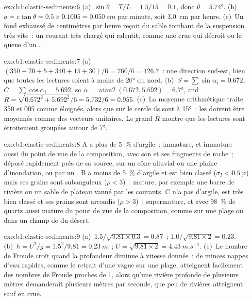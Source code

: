 \begin{solution}{exo:b1:clastic-sediments:6}
(a)~$\sin\theta = T/L = 1.5/15 = 0.1$, donc $\theta = \ang{5.74}$. (b)~$a =
c\tan\theta = 0.5 \times 0.1005 = \qty{0.050}{cm}$ par minute, soit
\qty{3.0}{cm} par heure. (c)~Un fond exhaussé de centimètres par heure reçoit du sable
tombant de la suspension très vite~: un courant très chargé qui ralentit,
comme une crue qui décroît ou la queue d'un .
\end{solution}

\begin{solution}{exo:b1:clastic-sediments:7}
(a)~$(350 + 20 + 5 + 340 + 15 + 30)/6 = 760/6 = 126.7$~: une direction
sud-est, bien que toutes les lectures soient à moins de \ang{20} du nord. (b)~$S =
\sum\sin\alpha_i = 0.672$, $C = \sum\cos\alpha_i = 5.692$, so $\bar\alpha =
\operatorname{atan2}(0.672, 5.692) = \ang{6.7}$, and $\bar R =
\sqrt{0.672^2 + 5.692^2}/6 = 5.732/6 = 0.955$. (c)~La moyenne arithmétique traite
350 et 005 comme éloignés, alors que sur le cercle ils sont à \ang{15}~: les 
doivent être moyennés comme des vecteurs unitaires. Le grand $\bar R$ montre que les lectures sont
étroitement groupées autour de \ang{7}.
\end{solution}

\begin{solution}{exo:b1:clastic-sediments:8}
A a plus de \qty{5}{\percent} d'argile~: immature, et immature aussi du point de vue de la composition,
avec son  et ses fragments de roche~; déposé rapidement près de sa
source, sur un cône alluvial ou une plaine d'inondation, ou par un . B a moins
de \qty{5}{\percent} d'argile et est bien classé ($\sigma_I < 0.5\,\varphi$) mais ses
grains sont subanguleux ($\rho < 3$)~: mature, par exemple une barre de rivière ou un sable
de plateau vanné par les courants. C n'a pas d'argile, est très bien classé et ses grains sont
arrondis ($\rho > 3$)~: supermature, et avec \qty{98}{\percent} de quartz aussi
mature du point de vue de la composition, comme sur une plage ou dans un champ de  du désert.
\end{solution}

\begin{solution}{exo:b1:clastic-sediments:9}
(a)~$1.5/\sqrt{9.81 \times 0.3} = 0.87$~; $1.0/\sqrt{9.81 \times 2} = 0.23$.
(b)~$h = U^2/g = 1.5^2/9.81 = \qty{0.23}{m}$~; $U = \sqrt{9.81 \times 2} =
\qty{4.43}{m.s^{-1}}$. (c)~Le nombre de Froude croît quand la profondeur diminue à
vitesse donnée~: de minces nappes d'eau rapides, comme le retrait d'une vague sur une plage,
atteignent facilement des nombres de Froude proches de 1, alors qu'une rivière profonde de plusieurs mètres
demanderait plusieurs mètres par seconde, que peu de rivières atteignent sauf en crue.
\end{solution}

